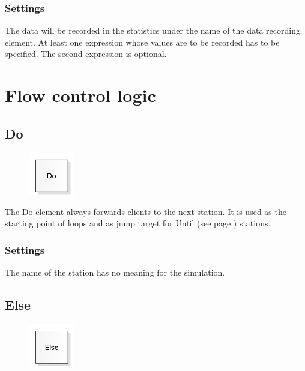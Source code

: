 \subsection*{Settings}

The data will be recorded in the statistics under the name of the data recording element. 
At least one expression whose values are to be recorded has to be specified.
The second expression is optional.





\chapter{Flow control logic}

\section{Do}
\label{ref:ModelElementLogicDo}

\begin{figure}
\vspace{-22pt}
\includegraphics[width=2cm]{imageModelElementLogicDo.png}
\vspace{-22pt}
\end{figure}

The Do element always forwards clients to the next station.
It is used as the starting point of loops and as jump target
for Until (see page \pageref{ref:ModelElementLogicUntil}) stations.

\subsection*{Settings}

The name of the station has no meaning for the simulation.


\section{Else}
\label{ref:ModelElementLogicElse}

\begin{figure}
\vspace{-22pt}
\includegraphics[width=2cm]{imageModelElementLogicElse.png}
\vspace{-22pt}
\end{figure}


